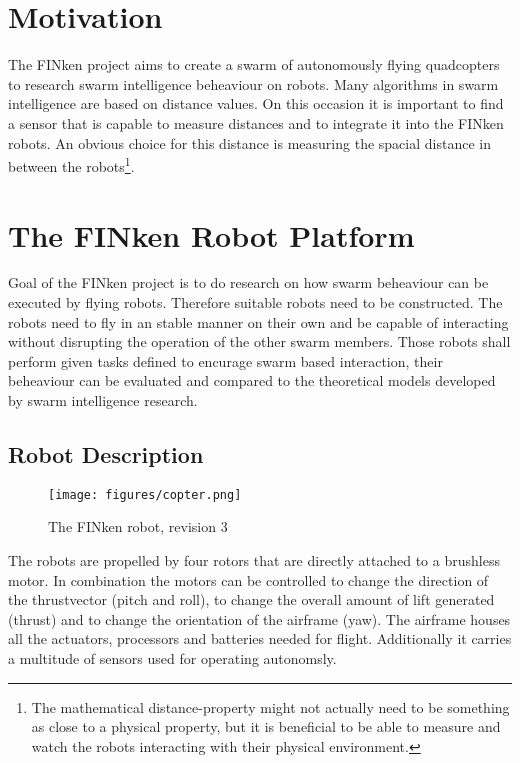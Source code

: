 \section{Motivation}

The FINken project aims to create a swarm of autonomously flying quadcopters to research swarm intelligence beheaviour on robots.
Many algorithms in swarm intelligence are based on distance values. 
On this occasion it is important to find a sensor that is capable to measure distances and to integrate it into the FINken robots.
An obvious choice for this distance is measuring the spacial distance in between the robots\footnote{
The mathematical distance-property might not actually need to be something as close to a physical property, but it is beneficial to be able to measure and watch the robots interacting with their physical environment.}.

\section{The FINken Robot Platform}

Goal of the FINken project is to do research on how swarm beheaviour can be executed by flying robots.
Therefore suitable robots need to be constructed.
The robots need to fly in an stable manner on their own and be capable of interacting without disrupting the operation of the other swarm members.
Those robots shall perform given tasks defined to encurage swarm based interaction, their beheaviour can be evaluated and compared to the theoretical models developed by swarm intelligence research.

\subsection{Robot Description}
\begin{figure}[H]
	\centering
\texttt{[image: figures/copter.png]}
\label{copterfoto}
\caption{The FINken robot, revision 3}
\end{figure}

The robots are propelled by four rotors that are directly attached to a brushless motor.
In combination the motors can be controlled to change the direction of the thrustvector (pitch and roll), to change the overall amount of lift generated (thrust) and to change the orientation of the airframe (yaw).
The airframe houses all the actuators, processors and batteries needed for flight.
Additionally it carries a multitude of sensors used for operating autonomsly.

